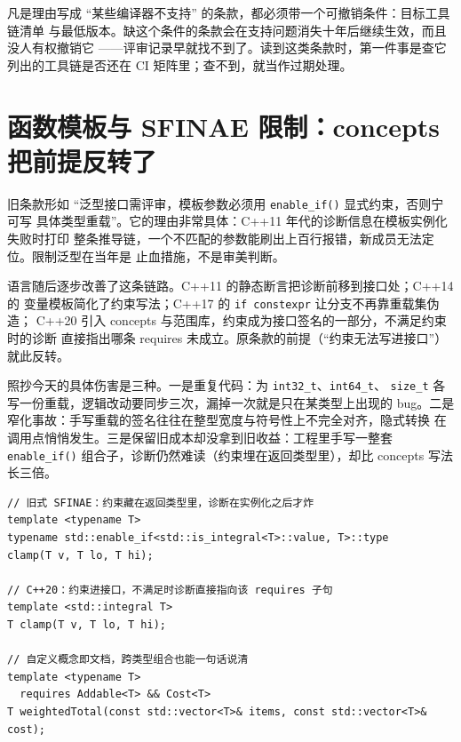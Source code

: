 \documentclass[12pt,a4paper,fontset=fandol]{ctexbook}
\newcommand{\cpp}[1]{C++#1}
\newcommand{\Fn}[1]{\texttt{#1()}}
\newcommand{\Tp}[1]{\texttt{#1}}
\begin{document}
\begin{warning}[title={``支持弱'' 类理由的通病}]
凡是理由写成 ``某些编译器不支持'' 的条款，都必须带一个可撤销条件：目标工具链清单
与最低版本。缺这个条件的条款会在支持问题消失十年后继续生效，而且没人有权撤销它
——评审记录早就找不到了。读到这类条款时，第一件事是查它列出的工具链是否还在
CI 矩阵里；查不到，就当作过期处理。
\end{warning}

\section{函数模板与 SFINAE 限制：concepts 把前提反转了}
\label{sec:ch12-concepts}

旧条款形如 ``泛型接口需评审，模板参数必须用 \Fn{enable\_if} 显式约束，否则宁可写
具体类型重载''。它的理由非常具体：\cpp{11} 年代的诊断信息在模板实例化失败时打印
整条推导链，一个不匹配的参数能刷出上百行报错，新成员无法定位。限制泛型在当年是
止血措施，不是审美判断。

语言随后逐步改善了这条链路。\cpp{11} 的静态断言把诊断前移到接口处；\cpp{14} 的
变量模板简化了约束写法；\cpp{17} 的 \Tp{if constexpr} 让分支不再靠重载集伪造；
\cpp{20} 引入 concepts 与范围库，约束成为接口签名的一部分，不满足约束时的诊断
直接指出哪条 requires 未成立。原条款的前提（``约束无法写进接口''）就此反转。

照抄今天的具体伤害是三种。一是重复代码：为 \Tp{int32\_t}、\Tp{int64\_t}、
\Tp{size\_t} 各写一份重载，逻辑改动要同步三次，漏掉一次就是只在某类型上出现的
bug。二是窄化事故：手写重载的签名往往在整型宽度与符号性上不完全对齐，隐式转换
在调用点悄悄发生。三是保留旧成本却没拿到旧收益：工程里手写一整套 \Fn{enable\_if}
组合子，诊断仍然难读（约束埋在返回类型里），却比 concepts 写法长三倍。

\begin{lstlisting}[style=cppstyle,caption={同一约束的两种表达：错误信息可读性差距的来源},label={lst:ch12-concepts}]
// 旧式 SFINAE：约束藏在返回类型里，诊断在实例化之后才炸
template <typename T>
typename std::enable_if<std::is_integral<T>::value, T>::type
clamp(T v, T lo, T hi);

// C++20：约束进接口，不满足时诊断直接指向该 requires 子句
template <std::integral T>
T clamp(T v, T lo, T hi);

// 自定义概念即文档，跨类型组合也能一句话说清
template <typename T>
  requires Addable<T> && Cost<T>
T weightedTotal(const std::vector<T>& items, const std::vector<T>& cost);
\end{lstlisting}
\end{document}
